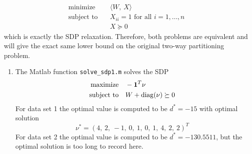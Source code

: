 \documentclass[11pt]{amsart}
\begin{document}
\begin{enumerate}
\begin{enumerate}
\begin{equation*}
\begin{aligned}
\mathrm{minimize} \quad & \langle W,\ X\rangle  \\
\textrm{subject to}\quad & X_{ii} = 1 \text{ for all } i = 1,\ldots, n\\
& X \succeq 0
\end{aligned}
\end{equation*}
which is exactly the SDP relaxation.  Therefore, both problems are equivalent and will give the exact same lower bound on the original two-way partitioning problem.
\end{enumerate}


\begin{enumerate}

\item The Matlab function \texttt{solve\_sdp1.m} solves the SDP
\begin{equation*}
\begin{aligned}
\mathrm{maximize} \quad & -{\bf 1}^T \nu  \\
\textrm{subject to}\quad & W + \mathrm{diag}(\nu) \succeq 0 \\
\end{aligned}
\end{equation*}
For data set 1 the optimal value is computed to be $d^* = -15$ with optimal solution
\[
\nu^* = (4,\ 2,\ -1,\ 0,\ 1,\ 0,\ 1,\ 4,\ 2,\ 2)^T
\]
For data set 2 the optimal value is computed to be $d^* = -130.5511$, but the optimal solution is too long to record here.



\end{enumerate}
\end{enumerate}
\end{document}

